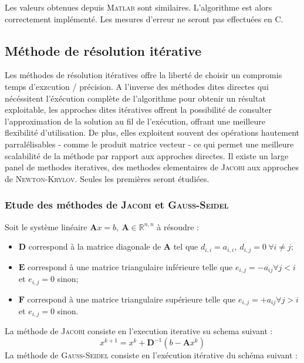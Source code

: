 \documentclass[12pt]{report}
\newcommand{\A}{\mathbf{A}}
\newcommand{\E}{\mathbf{E}}
\newcommand{\D}{\mathbf{D}}
\newcommand{\F}{\mathbf{F}}
\begin{document}
Les valeurs obtenues depuis \textsc{Matlab} sont similaires. L'algorithme est alors correctement implémenté. Les mesures d'erreur ne seront pas effectuées en C.

\subsection{Méthode de résolution itérative}

Les méthodes de résolution itératives offre la liberté de choisir un compromis temps d'exzcution / précision. A l'inverse des méthodes dites directes qui nécéssitent l'éxécution complète de l'algorithme pour obtenir un résultat exploitable, les approches dites itératives offrent la possibilité de consulter l'approximation de la solution au fil de l'exécution, offrant une meilleure flexibilité d'utilisation. De plus, elles exploitent souvent des opérations hautement parralélisables - comme le produit matrice vecteur - ce qui permet une meilleure scalabilité de la méthode par rapport aux approches directes. Il existe un large panel de methodes iteratives, des methodes elementaires de \textsc{Jacobi} aux approches de \textsc{Newton-Krylov}. Seules les premières seront étudiées.


\subsubsection{Etude des méthodes de \textsc{Jacobi} et \textsc{Gauss-Seidel}}

Soit le système linéaire $\A x = b, ~ \A \in \mathbb{R}^{n,n}$ à résoudre :
\begin{itemize}
\item $\D$ correspond à la matrice diagonale de $\A$ tel que $d_{i,i} = a_{i,i}, ~ d_{i,j} = 0~ \forall i \ne j$;
\item $\E$ correspond à une matrice triangulaire inférieure telle que $e_{i,j} = - a_{ij} \forall j < i$ et $e_{i,j} = 0$ sinon;
\item $\F$ correspond à une matrice triangulaire supérieure telle que $e_{i,j} = + a_{ij} \forall j > i$ et $e_{i,j} = 0$ sinon.
\end{itemize}
La méthode de \textsc{Jacobi} consiste en l'execution iterative su schema suivant :
\begin{equation}
x^{k+1} = x^k + \D^{-1} \left( b - \A x^k  \right)
\end{equation}
La méthode de \textsc{Gauss-Seidel} consiste en l'exécution itérative du schéma suivant : 
\end{document}
